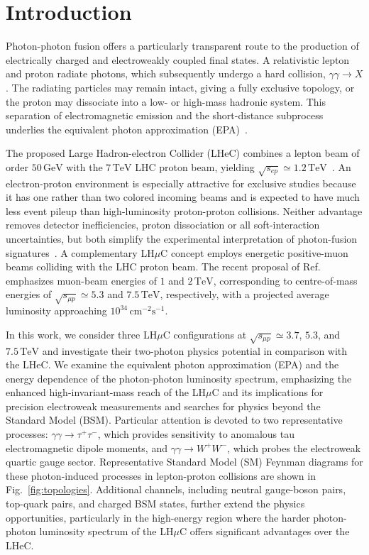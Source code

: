 \documentclass[11pt,a4paper]{article}
\newcommand{\TeV}{\,\mathrm{TeV}}
\newcommand{\GeV}{\,\mathrm{GeV}}
\begin{document}
\section{Introduction}

Photon-photon fusion offers a particularly transparent route to the production of 
electrically charged and electroweakly coupled final states. 
A relativistic lepton and proton radiate photons, 
which subsequently undergo a hard collision, $\gamma\gamma\to X$. The radiating particles may 
remain intact, giving a fully exclusive topology, or the proton 
may dissociate into a low- or high-mass hadronic system. 
This separation of electromagnetic emission and the short-distance subprocess underlies the 
equivalent photon approximation (EPA)~\cite{Budnev1975,Drees1989}. 

The proposed Large Hadron-electron Collider (LHeC) combines a lepton beam of order $50\GeV$ with 
the $7\TeV$ LHC proton beam, yielding $\sqrt{s_{ep}}\simeq1.2\TeV$~\cite{LHeCCDR2012,LHeC2025}. 
An electron-proton environment is especially attractive for exclusive studies because it 
has one rather than two colored incoming beams and is expected to have much less event 
pileup than high-luminosity proton-proton collisions. Neither advantage removes 
detector inefficiencies, proton dissociation or all soft-interaction uncertainties, but both simplify 
the experimental interpretation of photon-fusion signatures~\cite{ForthommeDIS2024,ForthommeICHEP2024}.
A complementary LH$\mu$C concept employs energetic positive-muon
beams colliding with the LHC proton beam. The recent proposal
of Ref.~\cite{Piotrzkowski2026} emphasizes muon-beam energies
of $1$ and $2\TeV$, corresponding to centre-of-mass energies
of $\sqrt{s_{\mu p}}\simeq 5.3$ and $7.5\TeV$, respectively,
with a projected average luminosity approaching
$10^{34}\,\mathrm{cm}^{-2}\mathrm{s}^{-1}$.  


In this work, we consider three LH$\mu$C configurations
at $\sqrt{s_{\mu p}}\simeq 3.7$, $5.3$, and $7.5\TeV$
and investigate their two-photon physics potential
in comparison with the LHeC. We examine the equivalent
photon approximation (EPA) and the energy dependence of
the photon-photon luminosity spectrum, emphasizing the
enhanced high-invariant-mass reach of the LH$\mu$C and
its implications for precision electroweak measurements
and searches for physics beyond the Standard Model (BSM).
Particular attention is devoted to two representative
processes: $\gamma\gamma\to\tau^+\tau^-$, which provides
sensitivity to anomalous tau electromagnetic dipole moments,
and $\gamma\gamma\to W^+W^-$, which probes the electroweak
quartic gauge sector. Representative Standard Model (SM)
Feynman diagrams for these photon-induced processes in
lepton-proton collisions are shown in
Fig.~\ref{fig:topologies}. Additional channels, including
neutral gauge-boson pairs, top-quark pairs, and charged
BSM states, further extend the physics opportunities,
particularly in the high-energy region where the harder
photon-photon luminosity spectrum of the LH$\mu$C
offers significant advantages over the LHeC.
\end{document}
